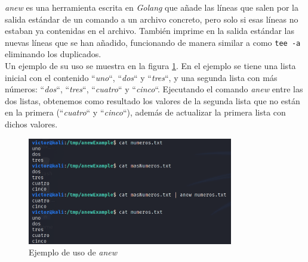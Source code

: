 \textit{anew}\cite{anew} es una herramienta escrita en \textit{Golang} que añade las líneas que salen por la salida estándar de un comando a un archivo concreto, pero solo si esas líneas no estaban ya contenidas en el archivo. También imprime en la salida estándar las nuevas líneas que se han añadido, funcionando de manera similar a como \texttt{tee -a} eliminando los duplicados.\\

Un ejemplo de su uso se muestra en la figura \ref{fig:anew-example}. En el ejemplo se tiene una lista inicial con el contenido ``\textit{uno}``, ``\textit{dos}`` y ``\textit{tres}``, y una segunda lista con más números: ``\textit{dos}``, ``\textit{tres}``, ``\textit{cuatro}`` y ``\textit{cinco}``. Ejecutando el comando \textit{anew} entre las dos listas, obtenemos como resultado los valores de la segunda lista que no están en la primera (``\textit{cuatro}`` y ``\textit{cinco}``), además de actualizar la primera lista con dichos valores.

\begin{figure}[h]
    \centering
    \includegraphics[width=0.80\textwidth]{images/sections/tools/anew-example.png}
    \caption{Ejemplo de uso de \textit{anew}}
    \label{fig:anew-example}
\end{figure}